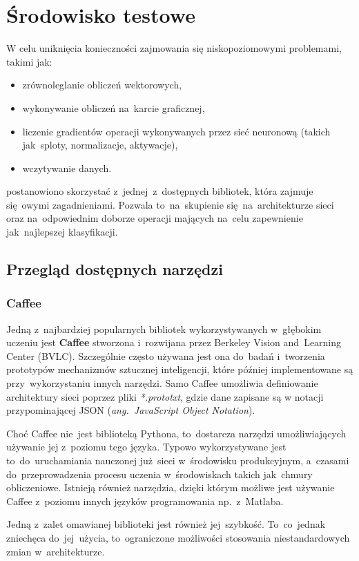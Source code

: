 \chapter{Środowisko testowe}
W celu uniknięcia konieczności zajmowania się niskopoziomowymi problemami, takimi jak:
\begin{itemize}
    \item zrównoleglanie obliczeń wektorowych,
    \item wykonywanie obliczeń na~karcie graficznej,
    \item liczenie gradientów operacji wykonywanych przez sieć neuronową (takich jak~sploty, normalizacje, aktywacje),
    \item wczytywanie danych.
\end{itemize}
postanowiono skorzystać z~jednej~z~dostępnych bibliotek, która zajmuje się~owymi zagadnieniami. Pozwala to~na~skupienie
się~na~architekturze sieci oraz na~odpowiednim doborze operacji mających na~celu zapewnienie jak~najlepszej
klasyfikacji.

\section{Przegląd dostępnych narzędzi}
\subsection{Caffee}
Jedną z~najbardziej popularnych bibliotek wykorzystywanych w~głębokim uczeniu jest \textbf{Caffee} stworzona
i~rozwijana przez Berkeley Vision and~Learning Center (BVLC). Szczególnie często używana jest ona do~badań i~tworzenia
prototypów mechanizmów sztucznej inteligencji, które później implementowane są przy~wykorzystaniu innych narzędzi.
Samo Caffee umożliwia definiowanie architektury sieci poprzez pliki \textit{*.prototxt}, gdzie dane zapisane są
w notacji przypominającej JSON (\textit{ang.~JavaScript Object Notation}).

Choć Caffee nie~jest biblioteką Pythona, to~dostarcza narzędzi umożliwiających używanie jej z~poziomu tego języka.
Typowo wykorzystywane jest to~do~uruchamiania nauczonej już~sieci w~środowisku produkcyjnym, a~czasami
do~przeprowadzenia procesu uczenia w~środowiskach takich jak~chmury obliczeniowe. Istnieją również narzędzia,
dzięki którym możliwe jest używanie Caffee z~poziomu innych języków programowania np.~z~Matlaba.

Jedną z~zalet omawianej biblioteki jest również jej~szybkość. To~co~jednak zniechęca do~jej~użycia, to~ograniczone
możliwości stosowania niestandardowych zmian w~architekturze.

